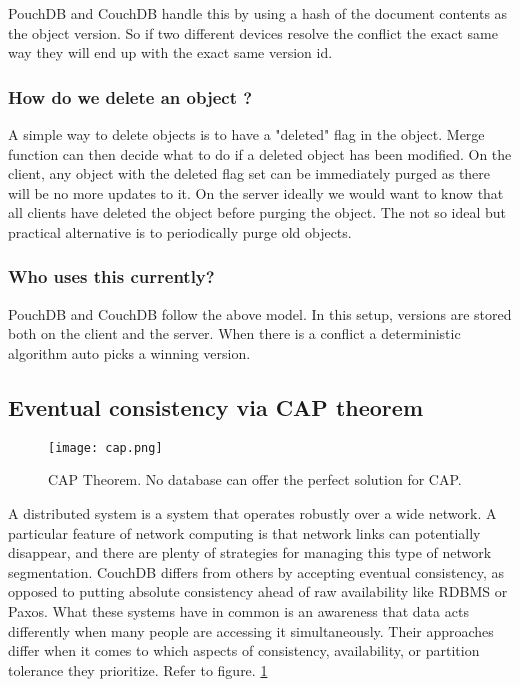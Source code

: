 PouchDB and CouchDB handle this by using a hash of the document contents as the object version. So if two 
different devices resolve the conflict the exact same way they will end up with the exact same version id.

\subsubsection{How do we delete an object ?}

A simple way to delete objects is to have a "deleted" flag in the object. 
Merge function can then decide what to do if a deleted object has been modified. 
On the client, any object with the deleted flag set can be immediately purged as 
there will be no more updates to it. On the server ideally we would want to know 
that all clients have deleted the object before purging the object. The not so ideal 
but practical alternative is to periodically purge old objects.

\subsubsection{Who uses this currently?}

PouchDB and CouchDB follow the above model. In this setup, versions are stored both on the client and 
the server. When there is a conflict a deterministic algorithm auto picks a winning version.


\subsection{Eventual consistency via CAP theorem}

\begin{figure}[h!]
    \begin{center}
        \texttt{[image: cap.png]}
    \end{center}
    \caption{CAP Theorem. No database can offer the perfect solution for CAP.}
    \label{fig:cap}
\end{figure}

A distributed system is a system that operates robustly over a wide network. 
A particular feature of network computing is that network links can potentially 
disappear, and there are plenty of strategies for managing this type of network 
segmentation. CouchDB differs from others by accepting eventual consistency, 
as opposed to putting absolute consistency ahead of raw availability like 
RDBMS or Paxos. What these systems have in common is an awareness that data 
acts differently when many people are accessing it simultaneously. 
Their approaches differ when it comes to which aspects of consistency, 
availability, or partition tolerance they prioritize. Refer to figure. \ref{fig:cap}

